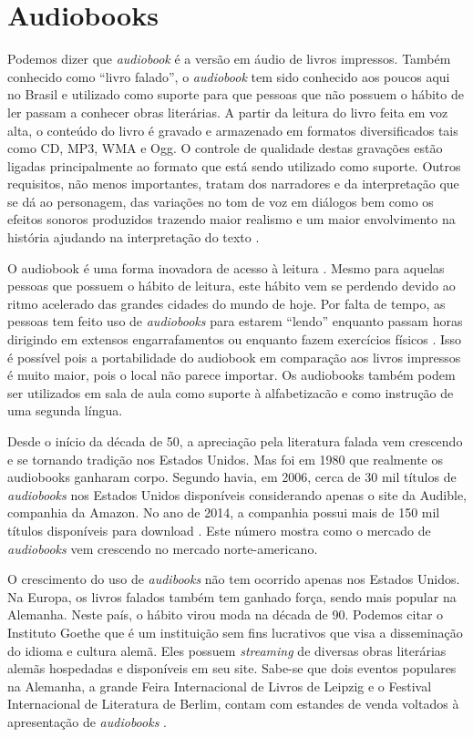 \section{Audiobooks}

Podemos dizer que \textit{audiobook} é a versão em áudio de livros impressos. Também conhecido como ``livro falado'', o \textit{audiobook} tem sido conhecido aos poucos aqui no Brasil e utilizado como suporte para que pessoas que não possuem o hábito de ler passam a conhecer obras literárias. A partir da leitura do livro feita em voz alta, o conteúdo do livro é gravado e armazenado em formatos diversificados tais como CD, MP3, WMA e Ogg. O controle de qualidade destas gravações estão ligadas principalmente ao formato que está sendo utilizado como suporte. Outros requisitos, não menos importantes, tratam dos narradores e da interpretação que se dá ao personagem, das variações no tom de voz em diálogos bem como os efeitos sonoros produzidos trazendo maior realismo e um maior envolvimento na história ajudando na interpretação  do texto \cite{torrenttitles}.

O audiobook é uma forma inovadora de acesso à leitura \cite{audiobooksuporte}. Mesmo para aquelas pessoas que possuem o hábito de leitura, este hábito vem se perdendo devido ao ritmo acelerado das grandes cidades do mundo de hoje. Por falta de tempo, as pessoas tem feito uso de \textit{audiobooks} para estarem ``lendo'' enquanto passam horas dirigindo em extensos engarrafamentos ou enquanto fazem exercícios físicos \cite{audiobookinovacao}. Isso é possível pois a portabilidade do audiobook em comparação aos livros impressos é muito maior, pois o local não parece importar. Os audiobooks também podem ser utilizados em sala de aula como suporte à alfabetizacão e como instrução de uma segunda língua.

Desde o início da década de 50, a apreciação pela literatura falada vem crescendo e se tornando tradição nos Estados Unidos. Mas foi em 1980 que realmente os audiobooks ganharam corpo. Segundo \cite{teixeira} havia, em 2006, cerca de 30 mil títulos de \textit{audiobooks} nos Estados Unidos disponíveis considerando apenas o site da Audible, companhia da Amazon. No ano de 2014, a companhia possui mais de 150 mil títulos disponíveis para download \cite{audible}. Este número mostra como o mercado de \textit{audiobooks} vem crescendo no mercado norte-americano.

O crescimento do uso de \textit{audibooks} não tem ocorrido apenas nos Estados Unidos. Na Europa, os livros falados também tem ganhado força, sendo mais popular na Alemanha. Neste país, o hábito virou moda na década de 90. Podemos citar o Instituto Goethe que é um instituição sem fins lucrativos que visa a disseminação do idioma e cultura alemã. Eles possuem \textit{streaming} de diversas obras literárias alemãs hospedadas e disponíveis em seu site. Sabe-se que dois eventos populares na Alemanha, a grande Feira Internacional de Livros de Leipzig e o Festival Internacional de Literatura de Berlim, contam com estandes de venda voltados à apresentação de \textit{audiobooks} \cite{dw}.


